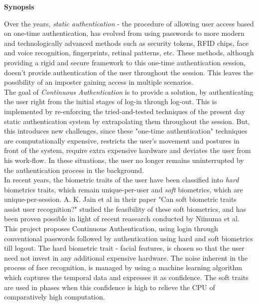 \documentclass[12pt]{article}			%
\begin{document}

\begin{center}
	{\LARGE \bf Synopsis}
\end{center}
Over the years, \emph{static authentication} - the procedure of allowing user access based on one-time authentication, has evolved from using passwords to more modern and technologically advanced methods such as security tokens, RFID chips, face and voice recognition, fingerprints, retinal patterns, etc.
These methods, although providing a rigid and secure framework to this one-time authentication session, doesn't provide authentication of the user throughout the session. This leaves the possibility of an imposter gaining access in multiple scenarios.\\[2ex]
The goal of \emph{Continuous Authentication} is to provide a solution, by authenticating the user right from the initial stages of log-in through log-out. This is implemented by re-enforcing the tried-and-tested techniques of the present day static authentication system by extrapolating them throughout the session. But, this introduces new challenges, since these "one-time authentication" techniques are computationally expensive, restricts the user's movement and postures in front of the system, require extra expensive hardware and deviates the user from his work-flow. In these situations, the user no longer remains uninterrupted by the authentication process in the background.\\[2ex]
In recent years, the biometric traits of the user have been classified into \emph{hard} biometrics traits, which remain unique-per-user and \emph{soft} biometrics, which are unique-per-session. A. K. Jain et al in their paper "Can soft biometric traits assist user recognition?" studied the feasibility of these soft biometrics, and has been proven possible in light of recent reasearch conducted by Niinuma et al.\\[2ex]
This project proposes Continuous Authentication, using login through conventional passwords followed by authentication using hard and soft biometrics till logout. The hard biometric trait - facial features, is chosen so that the user need not invest in any additional expensive hardware. The noise inherent in the process of face recognition, is managed by using a machine learning algorithm which captures the temporal data and expresses it as confidence. The soft traits are used in phases when this confidence is high to relieve the CPU of comparatively high computation.
\end{document}
